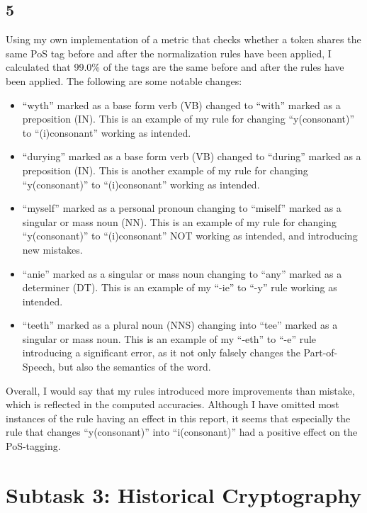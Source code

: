 \documentclass{article}
\begin{document}
\subsection{5}
Using my own implementation of a metric that checks whether a token shares the same PoS tag before and after the normalization rules have been applied, I calculated that 99.0\% of the tags are the same before and after the rules have been applied. The following are some notable changes:
\begin{itemize}
    \item ``wyth'' marked as a base form verb (VB) changed to ``with'' marked as a preposition (IN). This is an example of my rule for changing ``y(consonant)'' to ``(i)consonant'' working as intended.
    \item ``durying'' marked as a base form verb (VB) changed to ``during'' marked as a preposition (IN). This is another example of my rule for changing ``y(consonant)'' to ``(i)consonant'' working as intended.
    \item ``myself'' marked as a personal pronoun changing to ``miself'' marked as a singular or mass noun (NN). This is an example of my rule for changing ``y(consonant)'' to ``(i)consonant'' NOT working as intended, and introducing new mistakes.
    \item ``anie'' marked as a singular or mass noun changing to ``any'' marked as a determiner (DT). This is an example of my ``-ie'' to ``-y'' rule working as intended.
    \item ``teeth'' marked as a plural noun (NNS) changing into ``tee'' marked as a singular or mass noun. This is an example of my ``-eth'' to ``-e'' rule introducing a significant error, as it not only falsely changes the Part-of-Speech, but also the semantics of the word.
\end{itemize}
Overall, I would say that my rules introduced more improvements than mistake, which is reflected in the computed accuracies. Although I have omitted most instances of the rule having an effect in this report, it seems that especially the rule that changes ``y(consonant)'' into ``i(consonant)'' had a positive effect on the PoS-tagging.

\section{Subtask 3: Historical Cryptography}
\end{document}
